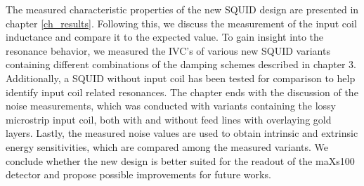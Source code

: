 The measured characteristic properties of the new SQUID design are presented in chapter \ref{ch_results}. Following this, we discuss the measurement of the input coil inductance and compare it to the expected value. To gain insight into the resonance behavior, we measured the IVC's of various new SQUID variants containing different combinations of the damping schemes described in chapter 3. Additionally, a SQUID without input coil has been tested for comparison to help identify input coil related resonances. The chapter ends with the discussion of the noise measurements, which was conducted with variants containing the lossy microstrip input coil, both with and without feed lines with overlaying gold layers. Lastly, the measured noise values are used to obtain intrinsic and extrinsic energy sensitivities, which are compared among the measured variants. We conclude whether the new design is better suited for the readout of the maXs100 detector and propose possible improvements for future works.    